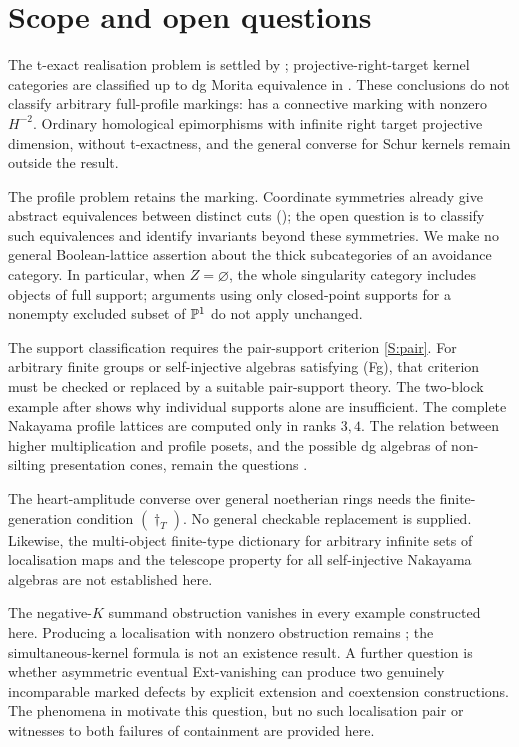 \section{Scope and open questions}\label{sec:limitations}

The t-exact realisation problem is settled by ; projective-right-target kernel categories are classified up to dg Morita equivalence in . These conclusions do not classify arbitrary full-profile markings:  has a connective marking with nonzero \(H^{-2}\). Ordinary homological epimorphisms with infinite right target projective dimension, without t-exactness, and the general converse for Schur kernels remain outside the result.

The profile problem retains the marking. Coordinate symmetries already give abstract equivalences between distinct cuts (); the open question is to classify such equivalences and identify invariants beyond these symmetries. We make no general Boolean-lattice assertion about the thick subcategories of an avoidance category. In particular, when \(Z=\varnothing\), the whole singularity category includes objects of full support; arguments using only closed-point supports for a nonempty excluded subset of \(\mathbb P^1\) do not apply unchanged.

The support classification requires the pair-support criterion \ref{S:pair}. For arbitrary finite groups or self-injective algebras satisfying \textup{(Fg)}, that criterion must be checked or replaced by a suitable pair-support theory. The two-block example after  shows why individual supports alone are insufficient. The complete Nakayama profile lattices are computed only in ranks \(3,4\). The relation between higher multiplication and profile posets, and the possible dg algebras of non-silting presentation cones, remain the questions .

The heart-amplitude converse over general noetherian rings needs the finite-generation condition \((\dagger_T)\). No general checkable replacement is supplied. Likewise, the multi-object finite-type dictionary for arbitrary infinite sets of localisation maps and the telescope property for all self-injective Nakayama algebras are not established here.

The negative-\(K\) summand obstruction vanishes in every example constructed here. Producing a localisation with nonzero obstruction remains ; the simultaneous-kernel formula is not an existence result. A further question is whether asymmetric eventual Ext-vanishing can produce two genuinely incomparable marked defects by explicit extension and coextension constructions. The phenomena in \cite{HunekeJorgensen03,JorgensenSega04} motivate this question, but no such localisation pair or witnesses to both failures of containment are provided here.

